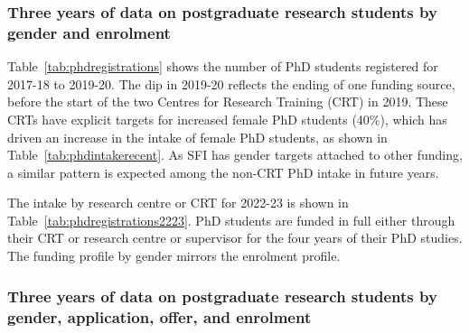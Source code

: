 \subsubsection{Three years of data on postgraduate research students 
by gender and enrolment}
\label{sub:phdnumbers}


Table~\ref{tab:phdregistrations} shows the number of
PhD students registered for  2017-18 to 2019-20. 
The dip in 2019-20 reflects the ending of one funding source,
before the start of the two Centres for Research Training (CRT)
in 2019. These CRTs have explicit targets for 
increased female PhD students (40\%), which has driven an 
increase in the intake of female PhD students, as shown in Table~\ref{tab:phdintakerecent}.
As SFI has gender targets attached to other funding, a similar 
pattern is expected among the non-CRT PhD intake in future years.








The intake by research centre or CRT for 2022-23 is shown in 
Table~\ref{tab:phdregistrations2223}.
PhD students are funded in full either through their CRT or research 
centre or supervisor for the four years of their PhD studies. The 
funding profile by gender mirrors the enrolment profile.





\subsubsection{Three years of data on postgraduate research students by gender, 
application, offer, and enrolment}
\label{sec:phdnumbers}



